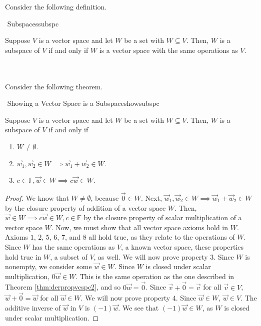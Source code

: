         Consider the following definition.
        \begin{definition}{\Stop\,\,Subspaces}{subspc}

            Suppose \(V\) is a vector space and let \(W\) be a set with \(W\subseteq V\). Then, \(W\) is a subspace of \(V\) if and only if \(W\) is a vector space with the same operations as \(V\).
            
        \end{definition}
        \vphantom
        \\
        \\
        Consider the following theorem.
        \begin{theorem}{\Stop\,\,Showing a Vector Space is a Subspace}{showsubspc}

            Suppose \(V\) is a vector space and let \(W\) be a set with \(W\subseteq V\). Then, \(W\) is a subspace of \(V\) if and only if
            \begin{enumerate}
                \item \(W\neq\emptyset\).
                \item \(\vec{w}_1,\vec{w}_2\in W\implies \vec{w}_1+\vec{w}_2\in W\).
                \item \(c\in\mathbb{F}, \vec{w}\in W\implies c\vec{w}\in W\).
            \end{enumerate}
            \begin{proof}
                We know that \(W\neq\emptyset\), because \(\vec{0}\in W\). Next, \(\vec{w}_1,\vec{w}_2\in W\implies \vec{w}_1+\vec{w}_2\in W\) by the closure property of addition of a vector space \(W\). Then, \(\vec{w}\in W\implies c\vec{w}\in W, c\in\mathbb{F}\) by the closure property of scalar multiplication of a vector space \(W\). Now, we must show that all vector space axioms hold in \(W\). Axioms \(1\), \(2\), \(5\), \(6\), \(7\), and \(8\) all hold true, as they relate to the operations of \(W\). Since \(W\) has the same operations as \(V\), a known vector space, these properties hold true in \(W\), a subset of \(V\), as well. We will now prove property \(3\). Since \(W\) is nonempty, we consider some \(\vec{w}\in W\). Since \(W\) is closed under scalar multiplication, \(0\vec{w}\in W\). This is the same operation as the one described in Theorem \ref{thm:derpropvcspc2}, and so \(0\vec{w}=\vec{0}\). Since \(\vec{v}+\vec{0}=\vec{v}\) for all \(\vec{v}\in V\), \(\vec{w}+\vec{0}=\vec{w}\) for all \(\vec{w}\in W\). We will now prove property \(4\). Since \(\vec{w}\in W\), \(\vec{w}\in V\). The additive inverse of \(\vec{w}\) in \(V\) is \((-1)\vec{w}\). We see that \((-1)\vec{w}\in W\), as \(W\) is closed under scalar multiplication.
            \end{proof}
        \end{theorem}
